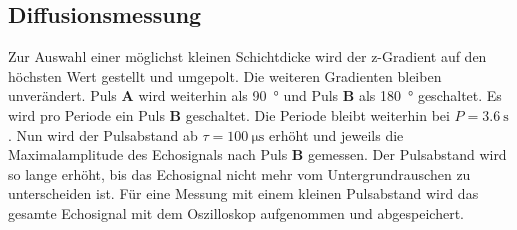 
\subsection{Diffusionsmessung}
Zur Auswahl einer möglichst kleinen Schichtdicke wird der z-Gradient auf den höchsten Wert gestellt und umgepolt.
Die weiteren Gradienten bleiben unverändert.
Puls \textbf{A} wird weiterhin als \SI{90}{\degree} und Puls \textbf{B} als \SI{180}{\degree} geschaltet.
Es wird pro Periode ein Puls \textbf{B} geschaltet.
Die Periode bleibt weiterhin bei $P = \SI{3.6}{\second}$.
Nun wird der Pulsabstand ab $\tau = \SI{100}{\micro\second}$ erhöht und jeweils die Maximalamplitude des Echosignals nach Puls \textbf{B} gemessen.
Der Pulsabstand wird so lange erhöht, bis das Echosignal nicht mehr vom Untergrundrauschen zu unterscheiden ist.
Für eine Messung mit einem kleinen Pulsabstand wird das gesamte Echosignal mit dem Oszilloskop aufgenommen und abgespeichert.
